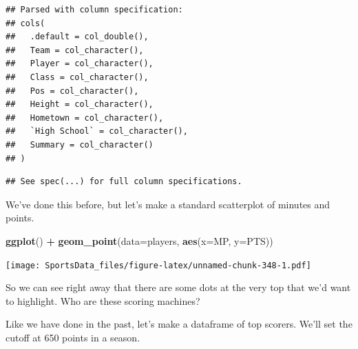\documentclass[
]{book}
\newenvironment{Shaded}{\begin{snugshade}}{\end{snugshade}}
\newcommand{\DataTypeTok}[1]{\textcolor[rgb]{0.13,0.29,0.53}{#1}}
\newcommand{\DecValTok}[1]{\textcolor[rgb]{0.00,0.00,0.81}{#1}}
\newcommand{\KeywordTok}[1]{\textcolor[rgb]{0.13,0.29,0.53}{\textbf{#1}}}
\newcommand{\NormalTok}[1]{#1}
\newcommand{\OperatorTok}[1]{\textcolor[rgb]{0.81,0.36,0.00}{\textbf{#1}}}
\newcommand{\StringTok}[1]{\textcolor[rgb]{0.31,0.60,0.02}{#1}}
\begin{document}
\begin{Shaded}
\end{Shaded}

\begin{verbatim}
## Parsed with column specification:
## cols(
##   .default = col_double(),
##   Team = col_character(),
##   Player = col_character(),
##   Class = col_character(),
##   Pos = col_character(),
##   Height = col_character(),
##   Hometown = col_character(),
##   `High School` = col_character(),
##   Summary = col_character()
## )
\end{verbatim}

\begin{verbatim}
## See spec(...) for full column specifications.
\end{verbatim}

We've done this before, but let's make a standard scatterplot of minutes and points.

\begin{Shaded}
\begin{Highlighting}[]
\KeywordTok{ggplot}\NormalTok{() }\OperatorTok{+}\StringTok{ }\KeywordTok{geom_point}\NormalTok{(}\DataTypeTok{data=}\NormalTok{players, }\KeywordTok{aes}\NormalTok{(}\DataTypeTok{x=}\NormalTok{MP, }\DataTypeTok{y=}\NormalTok{PTS))}
\end{Highlighting}
\end{Shaded}

\texttt{[image: SportsData\_files/figure-latex/unnamed-chunk-348-1.pdf]}

So we can see right away that there are some dots at the very top that we'd want to highlight. Who are these scoring machines?

Like we have done in the past, let's make a dataframe of top scorers. We'll set the cutoff at 650 points in a season.

\begin{Shaded}
\end{Shaded}
\end{document}

